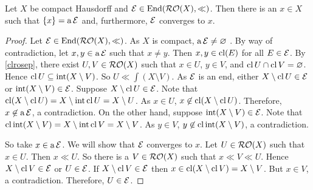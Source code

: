 \begin{lemma}
	\label{eaconv}
	Let \( X \) be compact Hausdorff and \( \mathcal{E} \in \operatorname{End}(\operatorname{\mathcal{RO}}(X),\mathord{\ll}) \).  Then there is an \( x \in X \) such that \( \{ x \} = \operatorname{a}\mathcal{E} \) and, furthermore, \( \mathcal{E} \) converges to \( x \).
\end{lemma}
\begin{proof}
	Let \( \mathcal{E} \in \operatorname{End}(\operatorname{\mathcal{RO}}(X),\mathord{\ll}) \).  As \( X \) is compact, \( \operatorname{a}\mathcal{E} \neq \varnothing \) \cite[V.5.1]{gaal}.  By way of contradiction, let \( x,y \in \operatorname{a}{\mathcal{E}} \) such that \( x \neq y \).  Then \( x,y \in \operatorname{cl}(E) \) for all \( E \in \mathcal{E} \).  By \ref{clrosep}, there exist \( U,V \in \operatorname{\mathcal{RO}}(X) \) such that \( x \in U \), \( y \in V \), and \( \operatorname{cl}{U} \cap \operatorname{cl}{V} = \varnothing \).  Hence \( \operatorname{cl}{U} \subseteq \operatorname{int}(X \setminus V) \).  So \( U \ll \int(X \setminus V) \).  As \( \mathcal{E} \) is an end, either \( X \setminus \operatorname{cl}{U} \in \mathcal{E} \) or \( \operatorname{int}(X \setminus V) \in \mathcal{E} \).  Suppose \( X \setminus \operatorname{cl}{U} \in \mathcal{E} \).  Note that \( \operatorname{cl}(X \setminus \operatorname{cl}{U}) = X \setminus \operatorname{int}\operatorname{cl}{U} = X \setminus U \).  As \( x \in U \), \( x \not\in \operatorname{cl}(X \setminus \operatorname{cl}{U}) \).  Therefore, \( x \not\in \operatorname{a}{\mathcal{E}} \), a contradiction.  On the other hand, suppose \( \operatorname{int}(X \setminus V) \in \mathcal{E} \).  Note that \( \operatorname{cl}\operatorname{int}(X \setminus V) = X \setminus \operatorname{int}\operatorname{cl}{V} = X \setminus V \).  As \( y \in V \), \( y \not\in \operatorname{cl}\operatorname{int}(X \setminus V) \), a contradiction.
	
	So take \( x \in \operatorname{a}{\mathcal{E}} \).  We will show that \( \mathcal{E} \) converges to \( x \).  Let \( U \in \operatorname{\mathcal{RO}}(X) \) such that \( x \in U \).  Then \( x \ll U \).  So there is a \( V \in \operatorname{\mathcal{RO}}(X) \) such that \( x \ll V \ll U \).  Hence \( X \setminus \operatorname{cl}{V} \in \mathcal{E} \) or \( U \in \mathcal{E} \).  If \( X \setminus \operatorname{cl}{V} \in \mathcal{E} \) then \( x \in \operatorname{cl}(X \setminus \operatorname{cl}{V}) = X \setminus V \).  But \( x \in V \), a contradiction.  Therefore, \( U \in \mathcal{E} \).
\end{proof}

